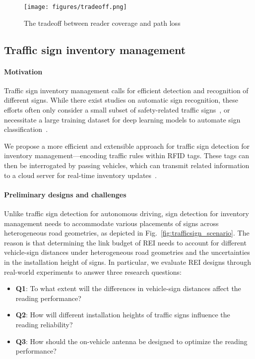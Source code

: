 \documentclass[lettersize,journal]{IEEEtran}
\begin{document}
\begin{figure*}[tb!]
\centering
\texttt{[image: figures/tradeoff.png]}
\caption{The tradeoff between reader coverage and path loss}
\label{fig:tradeoff}
\end{figure*}

\subsection{Traffic sign inventory management}
\paragraph{Motivation}
Traffic sign inventory management calls for efficient detection and recognition of different signs. While there exist studies on automatic sign recognition, these efforts often only consider a small subset of safety-related traffic signs~\cite{stallkamp2011german}, or necessitate a large training dataset for deep learning models to automate sign classification~\cite{tabernik2019deep}. 

We propose a more efficient and extensible approach for traffic sign detection for inventory management—encoding traffic rules within RFID tags. These tags can then be interrogated by passing vehicles, which can transmit related information to a cloud server for real-time inventory updates~\cite{garcia2018passive,chen2022rfid}.


\paragraph{Preliminary designs and challenges}\label{section:sign_challenge}

Unlike traffic sign detection for autonomous driving, sign detection for inventory management needs to accommodate various placements of signs across heterogeneous road geometries, as depicted in Fig.~\ref{fig:trafficsign_scenario}. The reason is that determining the link budget of REI needs to account for different vehicle-sign distances under heterogeneous road geometries and the uncertainties in the installation height of signs. In particular, we evaluate REI designs through real-world experiments to answer three research questions:

\begin{itemize}
    \item \textbf{Q1}: To what extent will the differences in vehicle-sign distances affect the reading performance?
    \item \textbf{Q2}: How will different installation heights of traffic signs influence the reading reliability?
    \item \textbf{Q3}: How should the on-vehicle antenna be designed to optimize the reading performance? 
\end{itemize}
\end{document}
